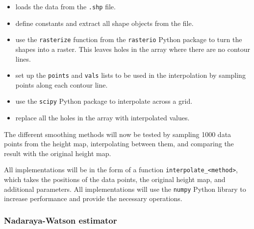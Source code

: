 \begin{itemize}
    \item {} loads the data from the \verb|.shp| file.
    \item {} define constants and extract all shape objects from the file.
    \item {} use the \verb|rasterize| function from the \verb|rasterio| Python package to turn the shapes into a raster. This leaves holes in the array where there are no contour lines.
    \item {} set up the \verb|points| and \verb|vals| lists to be used in the interpolation by sampling points along each contour line.
    \item {} use the \verb|scipy| Python package to interpolate across a grid.
    \item {} replace all the holes in the array with interpolated values.
\end{itemize}


The different smoothing methods will now be tested by sampling 1000 data points from the height map, interpolating between them, and comparing the result with the original height map.

All implementations will be in the form of a function \verb|interpolate_<method>|, which takes the positions of the data points, the original height map, and additional parameters. All implementations will use the \verb|numpy| Python library to increase performance and provide the necessary operations.

\subsubsection{Nadaraya-Watson estimator}

